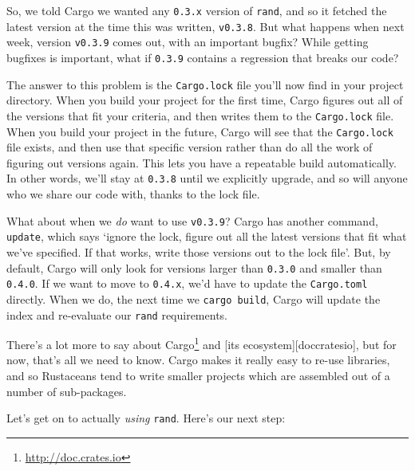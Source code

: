 \documentclass[a4paper,]{book}
\renewcommand{\href}[2]{#2\footnote{\url{#1}}}
\begin{document}
So, we told Cargo we wanted any \texttt{0.3.x} version of \texttt{rand},
and so it fetched the latest version at the time this was written,
\texttt{v0.3.8}. But what happens when next week, version
\texttt{v0.3.9} comes out, with an important bugfix? While getting
bugfixes is important, what if \texttt{0.3.9} contains a regression that
breaks our code?

The answer to this problem is the \texttt{Cargo.lock} file you'll now
find in your project directory. When you build your project for the
first time, Cargo figures out all of the versions that fit your
criteria, and then writes them to the \texttt{Cargo.lock} file. When you
build your project in the future, Cargo will see that the
\texttt{Cargo.lock} file exists, and then use that specific version
rather than do all the work of figuring out versions again. This lets
you have a repeatable build automatically. In other words, we'll stay at
\texttt{0.3.8} until we explicitly upgrade, and so will anyone who we
share our code with, thanks to the lock file.

What about when we \emph{do} want to use \texttt{v0.3.9}? Cargo has
another command, \texttt{update}, which says `ignore the lock, figure
out all the latest versions that fit what we've specified. If that
works, write those versions out to the lock file'. But, by default,
Cargo will only look for versions larger than \texttt{0.3.0} and smaller
than \texttt{0.4.0}. If we want to move to \texttt{0.4.x}, we'd have to
update the \texttt{Cargo.toml} directly. When we do, the next time we
\texttt{cargo\ build}, Cargo will update the index and re-evaluate our
\texttt{rand} requirements.

There's a lot more to say about \href{http://doc.crates.io}{Cargo} and
{[}its ecosystem{]}{[}doccratesio{]}, but for now, that's all we need to
know. Cargo makes it really easy to re-use libraries, and so Rustaceans
tend to write smaller projects which are assembled out of a number of
sub-packages.

Let's get on to actually \emph{using} \texttt{rand}. Here's our next
step:
\end{document}
